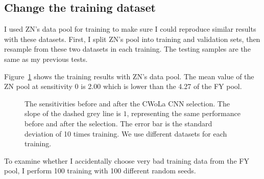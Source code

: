 \documentclass[12pt]{article}
\begin{document}
    \subsection{Change the training dataset}%
    \label{sub:change_the_training_dataset}
        I used ZN's data pool for training to make sure I could reproduce similar results with these datasets. First, I split ZN's pool into training and validation sets, then resample from these two datasets in each training. The testing samples are the same as my previous tests.

        Figure~\ref{fig:sensitivity_improvement_ZN_pool} shows the training results with ZN's data pool. The mean value of the ZN pool at sensitivity 0 is 2.00 which is lower than the 4.27 of the FY pool.
        \begin{figure}[htpb]
            \centering
            \caption{The sensitivities before and after the CWoLa CNN selection. The slope of the dashed grey line is $1$, representing the same performance before and after the selection. The error bar is the standard deviation of 10 times training. We use different datasets for each training.}
            \label{fig:sensitivity_improvement_ZN_pool}
        \end{figure}

        To examine whether I accidentally choose very bad training data from the FY pool, I perform 100 training with 100 different random seeds.
\end{document}
